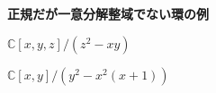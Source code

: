 \documentclass{jsarticle}
\begin{document}
    {\bf 正規だが一意分解整域でない環の例}
    
    $\mathbb{C}[x,y,z]/(z^2 - xy)$
    
    $\mathbb{C}[x,y]/(y^2 - x^2(x+1))$
    
\end{document}
